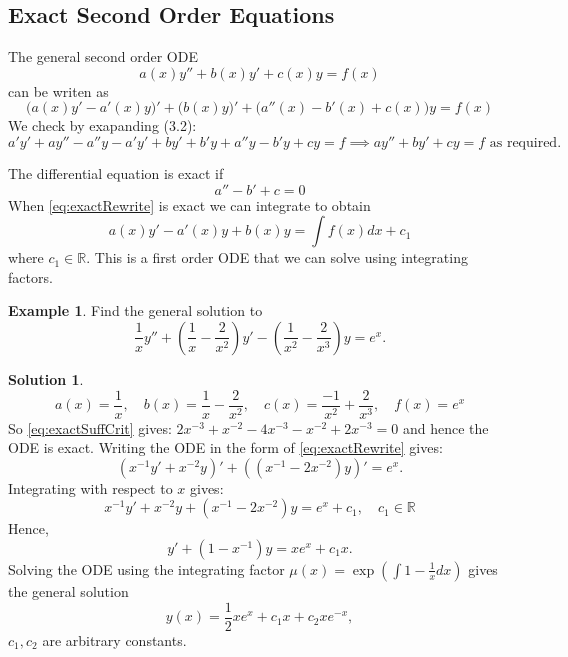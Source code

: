 \documentclass{article}
\theoremstyle{plain}
\theoremstyle{definition}
\newtheorem{exmp}{Example}[section]
\newtheorem*{sol}{Solution}
\numberwithin{equation}{section}
\begin{document}
\subsection{Exact Second Order Equations}

The general second order ODE
\begin{equation}\label{eq:generalLinear}
    a(x)y'' + b(x)y' + c(x)y = f(x)
\end{equation}
can be writen as
\begin{equation}\label{eq:exactRewrite}
    \big( a(x)y' - a'(x)y\big)' + \big(b(x)y\big)' + \big(a''(x) - b'(x) + c(x)\big)y = f(x)
\end{equation}
We check by exapanding (3.2):
\[ a'y'+ay'' - a''y - a'y' + by' + b'y + a''y - b'y + cy = f  \implies ay'' + by' + cy = f \text{ as required.}\]

The differential equation is exact if
\begin{equation}\label{eq:exactSuffCrit}
    a''-b'+c = 0
\end{equation}
When \eqref{eq:exactRewrite} is exact we can integrate to obtain
\[ a(x)y' - a'(x)y + b(x) y = \int f(x) dx + c_1 \]
where $c_1 \in \mathbb{R}$. This is a first order ODE that we can solve using integrating factors.

\begin{tcolorbox}
    \begin{exmp}
        Find the general solution to
        \[
            \frac{1}{x}y'' + \left( \frac{1}{x} - \frac{2}{x^2}\right)y' - \left(\frac{1}{x^2} - \frac{2}{x^3}\right)y = e^x.
        \]
    \end{exmp}
    \begin{sol}
        \[a(x) = \frac{1}{x}, \quad b(x) = \frac{1}{x} - \frac{2}{x^2},\quad c(x) = \frac{-1}{x^2} + \frac{2}{x^3},\quad f(x)=e^x \]
        So \eqref{eq:exactSuffCrit} gives: $2x^{-3} + x^{-2} - 4x^{-3} - x^{-2} + 2x^{-3} = 0$ and hence the ODE is exact. Writing the ODE in the form of \eqref{eq:exactRewrite} gives:
        \[ \left(x^{-1}y' + x^{-2}y\right)' + \left(\left(x^{-1}-2x^{-2}\right)y\right)' = e^x. \]
        Integrating with respect to $x$ gives:
        \[ x^{-1}y' + x^{-2}y + (x^{-1}-2x^{-2})y = e^x + c_1, \quad c_1 \in \mathbb{R} \]
        Hence,
        \[ y' + (1-x^{-1})y = xe^x + c_1x. \]
        Solving the ODE using the integrating factor $\mu(x) = \exp\left( \int 1-\frac{1}{x} dx \right) $ gives the general solution
        \[ y(x) = \frac{1}{2}xe^x + c_1x + c_2xe^{-x}, \]
        $c_1,c_2$ are arbitrary constants.
    \end{sol}
\end{tcolorbox}
\end{document}
